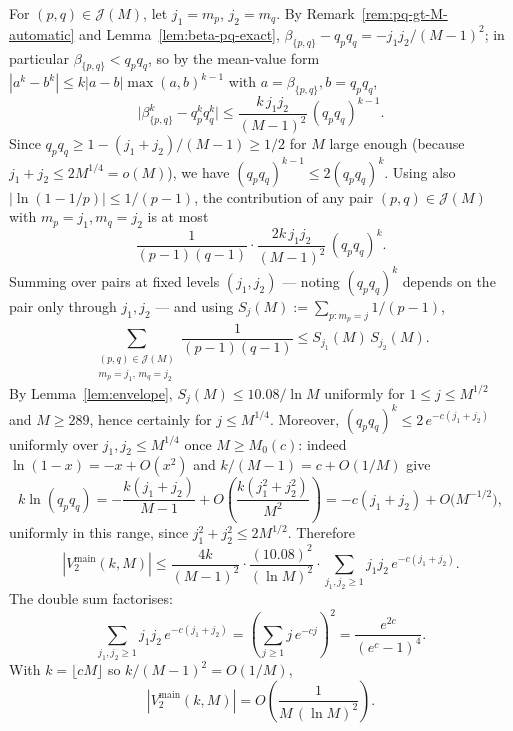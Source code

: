 \documentclass[11pt]{article}
\theoremstyle{remark}
\begin{document}
For $(p,q) \in \mathcal{J}(M)$, let $j_1 = m_p$, $j_2 = m_q$. By Remark~\ref{rem:pq-gt-M-automatic} and Lemma~\ref{lem:beta-pq-exact}, $\beta_{\{p,q\}} - q_p q_q = -j_1 j_2/(M-1)^2$; in particular $\beta_{\{p,q\}} < q_p q_q$, so by the mean-value form $|a^k - b^k| \leq k|a-b|\max(a,b)^{k-1}$ with $a = \beta_{\{p,q\}}, b = q_p q_q$,
\begin{equation}\label{eq:Delta-bound}
\bigl|\beta_{\{p,q\}}^k - q_p^k q_q^k\bigr| \leq \frac{k\, j_1 j_2}{(M-1)^2}\,(q_p q_q)^{k-1}.
\end{equation}
Since $q_p q_q \geq 1 - (j_1 + j_2)/(M-1) \geq 1/2$ for $M$ large enough (because $j_1+j_2 \leq 2 M^{1/4} = o(M)$), we have $(q_p q_q)^{k-1} \leq 2 (q_p q_q)^k$. Using also $|\ln(1 - 1/p)| \leq 1/(p-1)$, the contribution of any pair $(p,q) \in \mathcal{J}(M)$ with $m_p = j_1, m_q = j_2$ is at most
\[
\frac{1}{(p-1)(q-1)} \cdot \frac{2k\, j_1 j_2}{(M-1)^2}\,(q_p q_q)^k.
\]
Summing over pairs at fixed levels $(j_1, j_2)$ --- noting $(q_p q_q)^k$ depends on the pair only through $j_1, j_2$ --- and using $S_j(M) := \sum_{p \colon m_p = j} 1/(p-1)$,
\[
\sum_{\substack{(p,q) \in \mathcal{J}(M) \\ m_p = j_1,\, m_q = j_2}} \frac{1}{(p-1)(q-1)} \leq S_{j_1}(M)\, S_{j_2}(M).
\]
By Lemma~\ref{lem:envelope}, $S_j(M) \leq 10.08/\ln M$ uniformly for $1 \leq j \leq M^{1/2}$ and $M \geq 289$, hence certainly for $j \leq M^{1/4}$. Moreover, $(q_p q_q)^k \leq 2\, e^{-c(j_1+j_2)}$ uniformly over $j_1, j_2 \leq M^{1/4}$ once $M \geq M_0(c)$: indeed $\ln(1-x) = -x + O(x^2)$ and $k/(M-1) = c + O(1/M)$ give
\begin{equation}\label{eq:uniform-taylor}
k \ln(q_p q_q) = -\frac{k(j_1+j_2)}{M-1} + O\!\left(\frac{k(j_1^2+j_2^2)}{M^2}\right) = -c(j_1+j_2) + O\bigl(M^{-1/2}\bigr),
\end{equation}
uniformly in this range, since $j_1^2 + j_2^2 \leq 2M^{1/2}$. Therefore
\[
|V_2^{\mathrm{main}}(k, M)| \leq \frac{4k}{(M-1)^2}\cdot \frac{(10.08)^2}{(\ln M)^2}\cdot \sum_{j_1, j_2 \geq 1} j_1 j_2\, e^{-c(j_1 + j_2)}.
\]
The double sum factorises:
\[
\sum_{j_1, j_2 \geq 1} j_1 j_2\, e^{-c(j_1+j_2)} = \left(\sum_{j \geq 1} j\, e^{-cj}\right)^{\!2} = \frac{e^{2c}}{(e^c - 1)^4}.
\]
With $k = \lfloor cM \rfloor$ so $k/(M-1)^2 = O(1/M)$,
\begin{equation}\label{eq:V2-main-bound}
|V_2^{\mathrm{main}}(k, M)| = O\!\left(\frac{1}{M\,(\ln M)^2}\right).
\end{equation}
\end{document}
